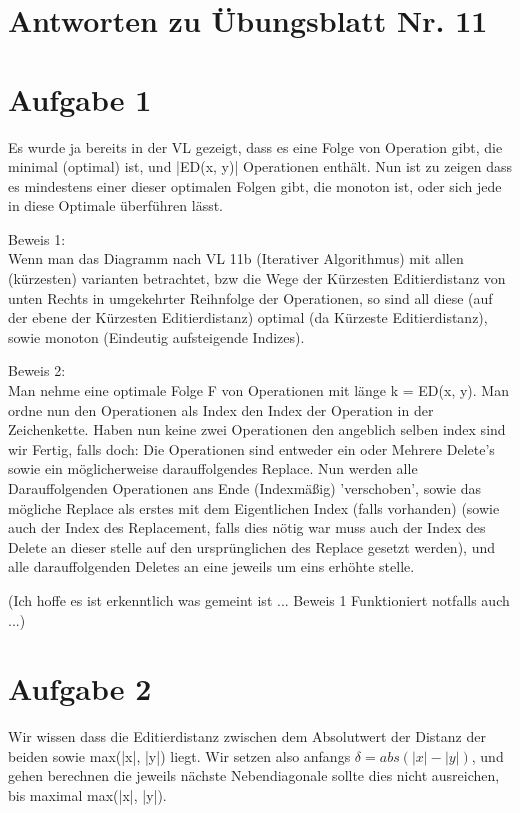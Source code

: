 \documentclass{scrartcl}
\begin{document}
\section*{Antworten zu Übungsblatt Nr. 11}


\section*{Aufgabe 1}

Es wurde ja bereits in der VL gezeigt, dass es eine Folge von Operation gibt,
die minimal (optimal) ist, und |ED(x, y)| Operationen enthält. Nun ist zu
zeigen dass es mindestens einer dieser optimalen Folgen gibt, die monoton ist,
oder sich jede in diese Optimale überführen lässt.

Beweis 1: \\
Wenn man das Diagramm nach VL 11b (Iterativer Algorithmus) mit allen (kürzesten)
varianten betrachtet, bzw die Wege der Kürzesten Editierdistanz von unten Rechts
in umgekehrter Reihnfolge der Operationen, so sind all diese (auf der ebene der
Kürzesten Editierdistanz) optimal (da Kürzeste Editierdistanz), sowie monoton
(Eindeutig aufsteigende Indizes).


Beweis 2: \\
Man nehme eine optimale Folge F von Operationen mit länge k = ED(x, y).
Man ordne nun den Operationen als Index den Index der Operation in der
Zeichenkette. Haben nun keine zwei Operationen den angeblich selben index
sind wir Fertig, falls doch: Die Operationen sind entweder ein oder Mehrere
Delete's sowie ein möglicherweise darauffolgendes Replace. Nun werden alle
Darauffolgenden Operationen ans Ende (Indexmäßig) 'verschoben', sowie das
mögliche Replace als erstes mit dem Eigentlichen Index (falls vorhanden)
(sowie auch der Index des Replacement, falls dies nötig war muss auch der
Index des Delete an dieser stelle auf den ursprünglichen des Replace gesetzt
werden), und alle darauffolgenden Deletes an eine jeweils um eins erhöhte stelle.

(Ich hoffe es ist erkenntlich was gemeint ist ... Beweis 1 Funktioniert notfalls auch ...)


\section*{Aufgabe 2}
Wir wissen dass die Editierdistanz zwischen dem Absolutwert der Distanz der beiden sowie
max(|x|, |y|) liegt. Wir setzen also anfangs $\delta = abs(|x| - |y|)$, und gehen berechnen
die jeweils nächste Nebendiagonale sollte dies nicht ausreichen, bis maximal max(|x|, |y|).
\end{document}
